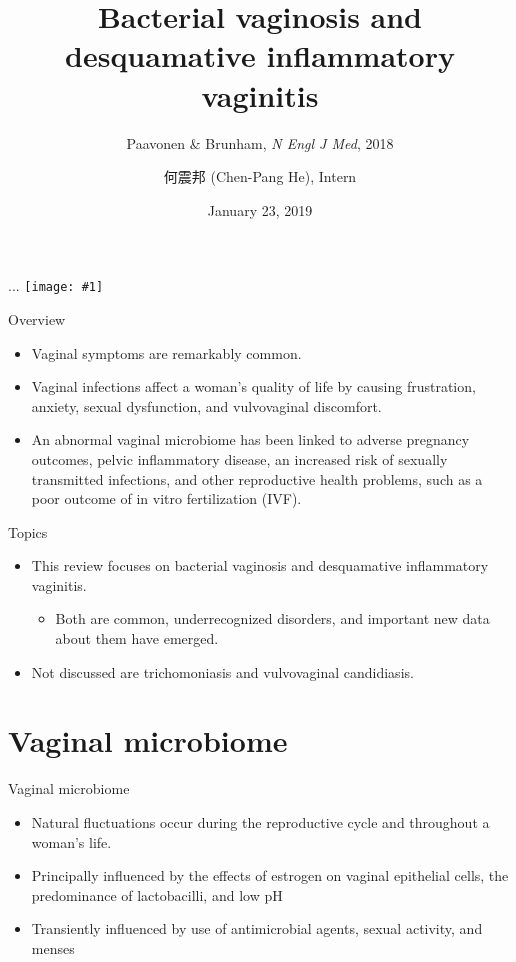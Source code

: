 \documentclass{beamer}
\title[Vaginitis]{Bacterial vaginosis and desquamative inflammatory vaginitis}
\subtitle{Paavonen \& Brunham, \textit{N Engl J Med}, 2018}
\author[Chen-Pang He]{何震邦 (Chen-Pang He), Intern}
\date{January 23, 2019}
\institute[CGH]{Cathay General Hospital}
\newcommand*{\solo}[1]{\centering\texttt{[image: \#1]}}
\begin{document}
\maketitle

\begin{frame}{...}
    \solo{pollo.jpg}
\end{frame}

\begin{frame}{Overview}
    \begin{itemize}
        \item Vaginal symptoms are remarkably common.
        \item Vaginal infections affect a woman's quality of life by causing
              frustration, anxiety, sexual dysfunction, and vulvovaginal
              discomfort.
        \item An abnormal vaginal microbiome has been linked to adverse
              pregnancy outcomes, pelvic inflammatory disease, an increased
              risk of sexually transmitted infections, and other reproductive
              health problems, such as a poor outcome of in vitro fertilization
              (IVF).
    \end{itemize}
\end{frame}

\begin{frame}{Topics}
    \begin{itemize}
        \item This review focuses on bacterial vaginosis and desquamative inflammatory vaginitis.
            \begin{itemize}
                \item Both are common, underrecognized disorders, and important new data about them have emerged.
            \end{itemize}
        \item Not discussed are trichomoniasis and vulvovaginal candidiasis.
    \end{itemize}
\end{frame}

\section{Vaginal microbiome}
\begin{frame}{Vaginal microbiome}
    \begin{itemize}
        \item Natural fluctuations occur during the reproductive cycle and
              throughout a woman's life.
        \item Principally influenced by the effects of estrogen on vaginal
              epithelial cells, the predominance of lactobacilli, and low pH
        \item Transiently influenced by use of antimicrobial agents, sexual
              activity, and menses
    \end{itemize}
\end{frame}
\end{document}

